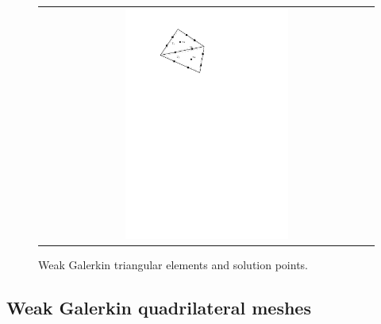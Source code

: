 \begin{figure}[h]
	\centering
	\begin{tabular}{c}
		\includegraphics[width=0.5\textwidth]{./pics/triangle.pdf}
	\end{tabular}
	\caption{\footnotesize Weak Galerkin triangular elements and solution points.}\label{fig1: triangle}
\end{figure}

\subsection{Weak Galerkin quadrilateral meshes}

